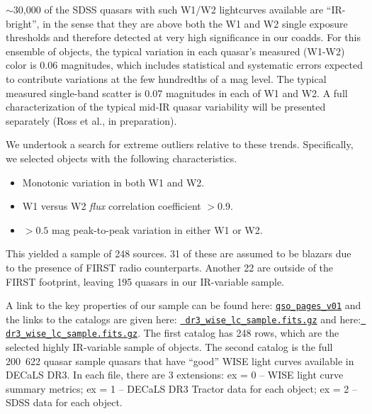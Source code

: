\documentclass[11pt,a4paper]{article}
\begin{document}
$\sim$30,000 of the SDSS quasars with such W1/W2 lightcurves available
are ``IR-bright'', in the sense that they are above both the W1 and W2
single exposure thresholds and therefore detected at very high
significance in our coadds. For this ensemble of objects, the typical
variation in each quasar's measured (W1-W2) color is 0.06 magnitudes,
which includes statistical and systematic errors expected to
contribute variations at the few hundredths of a mag level. The
typical measured single-band scatter is 0.07 magnitudes in each of W1
and W2. A full characterization of the typical mid-IR quasar
variability will be presented separately (Ross et al., in
preparation).

We undertook a search for extreme outliers relative to these trends.
Specifically, we selected objects with the following characteristics.

\begin{itemize}
\item Monotonic variation in both W1 and W2.
\item W1 versus W2 \textit{flux} correlation coefficient $>$0.9.
\item $>0.5$ mag peak-to-peak variation in either W1 or W2.
\end{itemize}

This yielded a sample of 248 sources. 31 of these are assumed to be blazars 
due to the presence of FIRST radio counterparts. Another 22 are outside of the 
FIRST  footprint, leaving 195 quasars in our IR-variable sample. 


A link to the key properties of our sample can be found here:
\href{http://portal.nersc.gov/project/cosmo/temp/ameisner/qso\_pages\_v01/}
{\tt qso\_pages\_v01} and the links to the catalogs are given here:
\href{http://portal.nersc.gov/project/cosmo/temp/ameisner/dr3_wise_lc_sample.fits.gz}{{\tt
dr3\_wise\_lc\_sample.fits.gz}} and here:
\href{http://portal.nersc.gov/project/cosmo/temp/ameisner/dr3_wise_lc_metrics_all_qso.fits.gz}{{\tt
dr3\_wise\_lc\_sample.fits.gz}}.  The first catalog has 248 rows,
which are the selected highly IR-variable sample of objects.  The
second catalog is the full \hbox{200 622} quasar sample quasars that
have ``good'' WISE light curves available in DECaLS DR3. In each file,
there are 3 extensions: ex = 0 -- WISE light curve summary metrics; ex
= 1 -- DECaLS DR3 Tractor data for each object; ex = 2 -- SDSS data
for each object.
\end{document}
